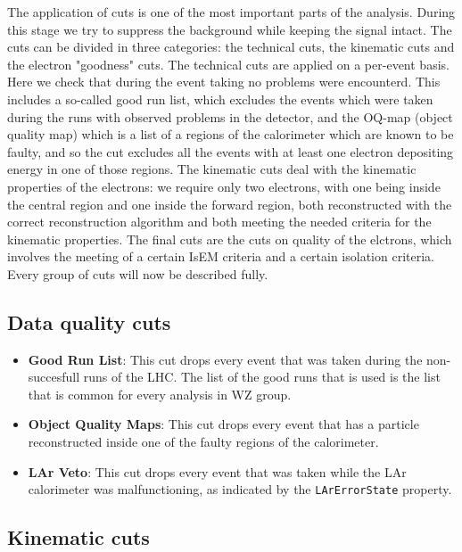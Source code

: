 The application of cuts is one of the most important parts of the analysis. During this stage we try to suppress the background while keeping the signal intact. The cuts can be divided in three categories: the technical cuts, the kinematic cuts and the electron "goodness" cuts. The technical cuts are applied on a per-event basis. Here we check that during the event taking no problems were encounterd. This includes a so-called good run list, which excludes the events which were taken during the runs with observed problems in the detector, and the OQ-map (object quality map) which is a list of a regions of the calorimeter which are known to be faulty, and so the cut excludes all the events with at least one electron depositing energy in one of those regions. The kinematic cuts deal with the kinematic properties of the electrons: we require only two electrons, with one being inside the central region and one inside the forward region, both reconstructed with the correct reconstruction algorithm and both meeting the needed criteria for the kinematic properties. The final cuts are the cuts on quality of the elctrons, which involves the meeting of a certain IsEM criteria and a certain isolation criteria. Every group of cuts will now be described fully.

\subsection{Data quality cuts}
\label{sec:Sel_GRL_OQ}

\begin{itemize}
\item {\bfseries Good Run List}: This cut drops every event that was taken during the non-succesfull runs of the LHC. The list of the good runs that is used is the list that is common for every analysis in WZ group.
\item {\bfseries Object Quality Maps}: This cut drops every event that has a particle reconstructed inside one of the faulty regions of the calorimeter.
\item {\bfseries LAr Veto}: This cut drops every event that was taken while the LAr calorimeter was malfunctioning, as indicated by the \texttt{LArErrorState} property.
\end{itemize}

\subsection{Kinematic cuts}
\label{sec:Sel_kinematic}

